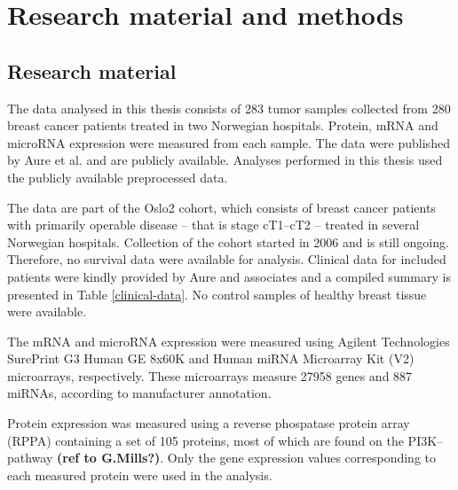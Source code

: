 


\section{Research material and methods}\label{material-and-methods}

\subsection{Research material}

The data analysed in this thesis consists of 283 tumor samples collected from
280 breast cancer patients treated in two Norwegian hospitals. Protein, mRNA
and microRNA expression were measured from each sample. The data were
published by Aure et al. \citep{Aure2015} and are publicly available. Analyses
performed in this thesis used the publicly available preprocessed data.

The data are part of the Oslo2 cohort, which consists of breast cancer
patients with primarily operable disease -- that is stage cT1--cT2 -- treated
in several Norwegian hospitals. Collection of the cohort started in 2006 and
is still ongoing. Therefore, no survival data were available for analysis.
Clinical data for included patients were kindly provided by Aure and
associates and a compiled summary is presented in Table \ref{clinical-data}. No
control samples of healthy breast tissue were available.



The mRNA and microRNA expression were measured using Agilent Technologies
SurePrint G3 Human GE 8x60K and Human miRNA Microarray Kit (V2) microarrays,
respectively. These microarrays measure 27958 genes and 887 miRNAs, according to
manufacturer annotation.

Protein expression was measured using a reverse phospatase protein array
(RPPA) containing a set of 105 proteins, most of which are found on the PI3K--
pathway \textbf{(ref to G.Mills?)}. Only the gene expression values
corresponding to each measured protein were used in the analysis.






